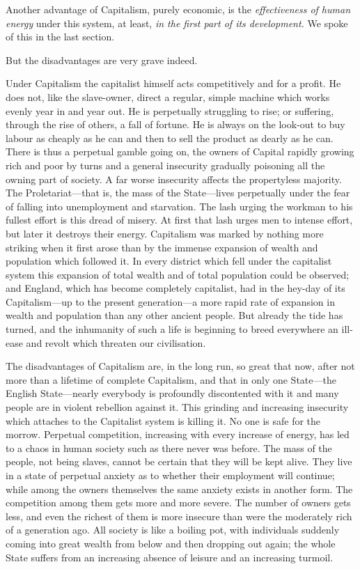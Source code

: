 \documentclass{book}
\begin{document}
Another advantage of Capitalism, purely economic, is the \emph{effectiveness of human energy} under this system, at least, \emph{in the first part of its development.} We spoke of this in the last section.

But the disadvantages are very grave indeed.

Under Capitalism the capitalist himself acts competitively and for a profit. He does not, like the slave-owner, direct a regular, simple machine which works evenly year in and year out. He is perpetually struggling to rise; or suffering, through the rise of others, a fall of fortune. He is always on the look-out to buy labour as cheaply as he can and then to sell the product as dearly as he can. There is thus a perpetual gamble going on, the owners of Capital rapidly growing rich and poor by turns and a general insecurity gradually poisoning all the owning part of society. A far worse insecurity affects the propertyless majority. The Proletariat—that is, the mass of the State—lives perpetually under the fear of falling into unemployment and starvation. The lash urging the workman to his fullest effort is this dread of misery. At first that lash urges men to intense effort, but later it destroys their energy. Capitalism was marked by nothing more striking when it first arose than by the immense expansion of wealth and population which followed it. In every district which fell under the capitalist system this expansion of total wealth and of total population could be observed; and England, which has become completely capitalist, had in the hey-day of its Capitalism—up to the present generation—a more rapid rate of expansion in wealth and population than any other ancient people. But already the tide has turned, and the inhumanity of such a life is beginning to breed everywhere an ill-ease and revolt which threaten our civilisation.

The disadvantages of Capitalism are, in the long run, so great that now, after not more than a lifetime of complete Capitalism, and that in only one State—the English State—nearly everybody is profoundly discontented with it and many people are in violent rebellion against it. This grinding and increasing insecurity which attaches to the Capitalist system is killing it. No one is safe for the morrow. Perpetual competition, increasing with every increase of energy, has led to a chaos in human society such as there never was before. The mass of the people, not being slaves, cannot be certain that they will be kept alive. They live in a state of perpetual anxiety as to whether their employment will continue; while among the owners themselves the same anxiety exists in another form. The competition among them gets more and more severe. The number of owners gets less, and even the richest of them is more insecure than were the moderately rich of a generation ago. All society is like a boiling pot, with individuals suddenly coming into great wealth from below and then dropping out again; the whole State suffers from an increasing absence of leisure and an increasing turmoil.
\end{document}
